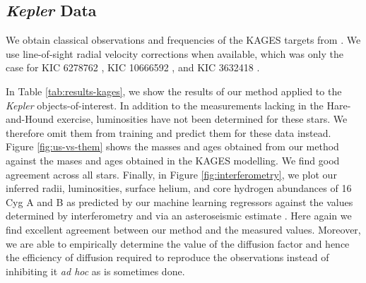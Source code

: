 \documentclass[manuscript]{aastex}
\begin{document}
\subsection{\emph{Kepler} Data}
We obtain classical observations and frequencies of the KAGES targets from \citet{2015MNRAS.452.2127S}. We use line-of-sight radial velocity corrections when available, which was only the case for KIC 6278762 \citep{2002AJ....124.1144L}, KIC 10666592 \citep{2013A&A...554A..84M}, and KIC 3632418 \citep{2006AstL...32..759G}. 

In Table \ref{tab:results-kages}, we show the results of our method applied to the \emph{Kepler} objects-of-interest. In addition to the measurements lacking in the Hare-and-Hound exercise, luminosities have not been determined for these stars. We therefore omit them from training and predict them for these data instead. Figure \ref{fig:us-vs-them} shows the masses and ages obtained from our method against the mases and ages obtained in the KAGES modelling. We find good agreement across all stars. Finally, in Figure \ref{fig:interferometry}, we plot our inferred radii, luminosities, surface helium, and core hydrogen abundances of 16 Cyg A and B as predicted by our machine learning regressors against the values determined by interferometry \citep{2013MNRAS.433.1262W} and via an asteroseismic estimate \citep{2014ApJ...790..138V}. Here again we find excellent agreement between our method and the measured values. Moreover, we are able to empirically determine the value of the diffusion factor and hence the efficiency of diffusion required to reproduce the observations instead of inhibiting it \emph{ad hoc} as is sometimes done. 

\end{document}
